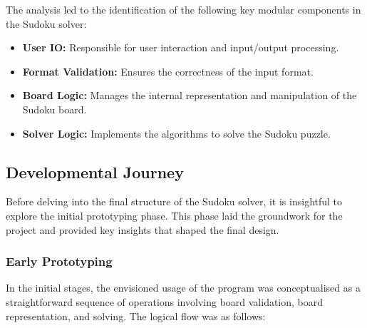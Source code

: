 \documentclass[11pt]{article}
\begin{document}
The analysis led to the identification of the following key modular components in the Sudoku solver:

\begin{itemize}
\item \textbf{User IO:} Responsible for user interaction and input/output processing.
\item \textbf{Format Validation:} Ensures the correctness of the input format.
\item \textbf{Board Logic:} Manages the internal representation and manipulation of the Sudoku board.
\item \textbf{Solver Logic:} Implements the algorithms to solve the Sudoku puzzle.
\end{itemize}


\subsection{Developmental Journey}
Before delving into the final structure of the Sudoku solver, it is insightful to explore the initial prototyping phase. This phase laid the groundwork for the project and provided key insights that shaped the final design.

\subsubsection{Early Prototyping}
In the initial stages, the envisioned usage of the program was conceptualised as a straightforward sequence of operations involving board validation, board representation, and solving. The logical flow was as follows:
\end{document}
